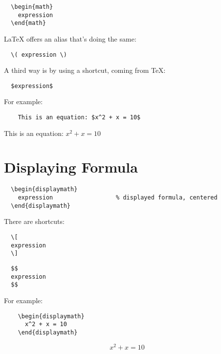 \begin{lstlisting}
  \begin{math}
    expression
  \end{math}
\end{lstlisting}

LaTeX offers an alias that's doing the same:

\begin{lstlisting}
  \( expression \)
\end{lstlisting}

A third way is by using a shortcut, coming from TeX:

\begin{lstlisting}
  $expression$
\end{lstlisting}

For example:
\begin{tcolorbox}
  \begin{lstlisting}
    This is an equation: $x^2 + x = 10$
  \end{lstlisting}
  This is an equation: $x^2 + x = 10$
\end{tcolorbox}

\section{Displaying Formula}

\begin{lstlisting}
  \begin{displaymath}
    expression                  % displayed formula, centered
  \end{displaymath}
\end{lstlisting}


There are shortcuts:
\begin{lstlisting}
  \[
  expression
  \]
\end{lstlisting}

\begin{lstlisting}
  $$
  expression
  $$
\end{lstlisting}



For example:
\begin{tcolorbox}
  \begin{lstlisting}
    \begin{displaymath}
      x^2 + x = 10
    \end{displaymath}
  \end{lstlisting}
  \begin{displaymath}
    x^2 + x = 10
  \end{displaymath}

\end{tcolorbox}


